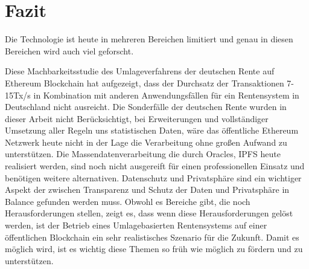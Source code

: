 \section{Fazit}
Die Technologie ist heute in mehreren Bereichen limitiert und genau in diesen Bereichen wird auch viel geforscht.

Diese Machbarkeitsstudie des Umlageverfahrens der deutschen Rente auf Ethereum Blockchain hat aufgezeigt, dass der Durchsatz der Transaktionen 7-15Tx/s in Kombination mit anderen Anwendungsfällen für ein Rentensystem in Deutschland nicht ausreicht. 
Die Sonderfälle der deutschen Rente wurden in dieser Arbeit nicht Berücksichtigt, bei Erweiterungen und vollständiger Umsetzung aller Regeln uns statistischen Daten, wäre das öffentliche Ethereum Netzwerk heute nicht in der Lage die Verarbeitung ohne großen Aufwand zu unterstützen.
Die Massendatenverarbeitung die durch Oracles, IPFS heute realisiert werden, sind noch nicht ausgereift für einen professionellen Einsatz und benötigen weitere alternativen.
Datenschutz und Privatsphäre sind ein wichtiger Aspekt der zwischen Transparenz und Schutz der Daten und Privatsphäre in Balance gefunden werden muss. 
Obwohl es Bereiche gibt, die noch Herausforderungen stellen, zeigt es, dass wenn diese Herausforderungen gelöst werden, ist der Betrieb eines Umlagebasierten Rentensystems auf einer öffentlichen Blockchain ein sehr realistisches Szenario für die Zukunft. Damit es möglich wird, ist es wichtig diese Themen so früh wie möglich zu fördern und zu unterstützen.

